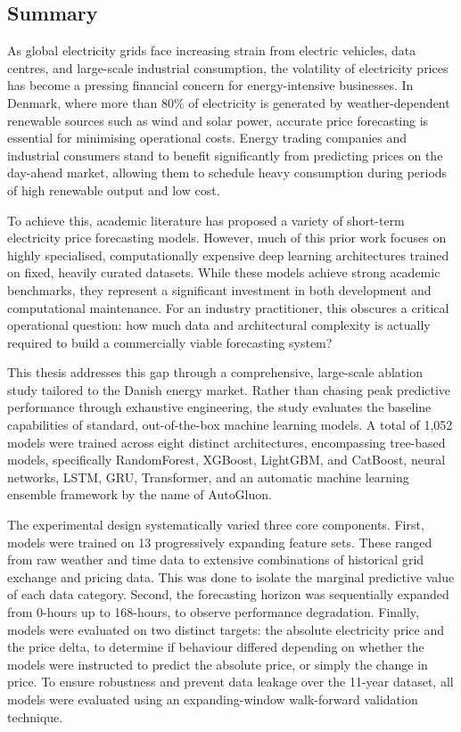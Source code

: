 \documentclass[conference]{IEEEtran}
\begin{document}
	\onecolumn
	\begin{center}
		\section*{Summary}
	\end{center}
As global electricity grids face increasing strain from electric vehicles, data 
centres, and large-scale industrial consumption, the volatility of electricity 
prices has become a pressing financial concern for energy-intensive businesses. 
In Denmark, where more than 80\% of electricity is generated by 
weather-dependent renewable sources such as wind and solar power, accurate price
forecasting is essential for minimising 
operational costs. Energy trading 
companies and industrial consumers stand to benefit significantly from 
predicting prices on the day-ahead market, allowing them to schedule heavy 
consumption during periods of high renewable output and low cost.

To achieve this, academic literature has proposed a variety of short-term 
electricity price forecasting models. However, much of this prior work focuses 
on highly specialised, computationally expensive 
deep learning architectures 
trained on fixed, heavily curated datasets. While these models achieve strong 
academic benchmarks, they represent a significant investment in both
development and computational maintenance. For an industry practitioner, this 
obscures a critical operational question: how much data and architectural 
complexity is actually required to build a commercially viable forecasting 
system?

This thesis addresses this gap through a comprehensive, large-scale ablation 
study tailored to the Danish energy market. Rather than chasing peak predictive 
performance through exhaustive engineering, the study evaluates the baseline 
capabilities of standard, out-of-the-box machine learning models. A total of 
1,052 models were trained across eight distinct architectures, encompassing 
tree-based models, specifically RandomForest, XGBoost, LightGBM, and CatBoost, 
neural networks, LSTM, GRU, Transformer, and an automatic machine learning 
ensemble framework by the name of AutoGluon.

The experimental design systematically varied three core components. First, 
models were trained on 13 progressively expanding feature sets. These ranged 
from raw weather and time data to extensive combinations of historical grid 
exchange and pricing data. This was done to isolate the marginal predictive 
value of each data category. Second, the forecasting horizon was
sequentially expanded from 0-hours up to 168-hours, to observe performance 
degradation. Finally, models were evaluated on two distinct targets: the 
absolute electricity price and the price delta, to determine if behaviour 
differed depending on whether the models were instructed to predict the 
absolute price, or simply the change in price. To ensure robustness and prevent 
data leakage over the 11-year dataset, all models were evaluated using an 
expanding-window walk-forward validation technique.
\end{document}
